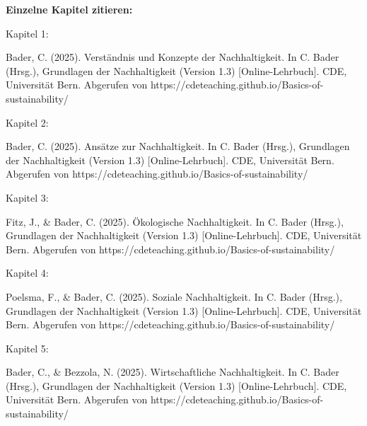 \documentclass[
  nswissgerman,
  a4paper,
  openany]{book}
\begin{document}
\textbf{Einzelne Kapitel zitieren:}

Kapitel 1:

Bader, C. (2025). Verständnis und Konzepte der Nachhaltigkeit. In C.
Bader (Hrsg.), Grundlagen der Nachhaltigkeit (Version 1.3)
{[}Online-Lehrbuch{]}. CDE, Universität Bern. Abgerufen von
https://cdeteaching.github.io/Basics-of-sustainability/

Kapitel 2:

Bader, C. (2025). Ansätze zur Nachhaltigkeit. In C. Bader (Hrsg.),
Grundlagen der Nachhaltigkeit (Version 1.3) {[}Online-Lehrbuch{]}. CDE,
Universität Bern. Abgerufen von
https://cdeteaching.github.io/Basics-of-sustainability/

Kapitel 3:

Fitz, J., \& Bader, C. (2025). Ökologische Nachhaltigkeit. In C. Bader
(Hrsg.), Grundlagen der Nachhaltigkeit (Version 1.3)
{[}Online-Lehrbuch{]}. CDE, Universität Bern. Abgerufen von
https://cdeteaching.github.io/Basics-of-sustainability/

Kapitel 4:

Poelsma, F., \& Bader, C. (2025). Soziale Nachhaltigkeit. In C. Bader
(Hrsg.), Grundlagen der Nachhaltigkeit (Version 1.3)
{[}Online-Lehrbuch{]}. CDE, Universität Bern. Abgerufen von
https://cdeteaching.github.io/Basics-of-sustainability/

Kapitel 5:

Bader, C., \& Bezzola, N. (2025). Wirtschaftliche Nachhaltigkeit. In C.
Bader (Hrsg.), Grundlagen der Nachhaltigkeit (Version 1.3)
{[}Online-Lehrbuch{]}. CDE, Universität Bern. Abgerufen von
https://cdeteaching.github.io/Basics-of-sustainability/
\end{document}
